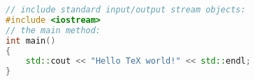 \documentclass{article}
\begin{document}
\begin{lstlisting}[language = C++]
// include standard input/output stream objects:
#include <iostream>
// the main method:
int main()
{
    std::cout << "Hello TeX world!" << std::endl;
}
\end{lstlisting}
\end{document}
